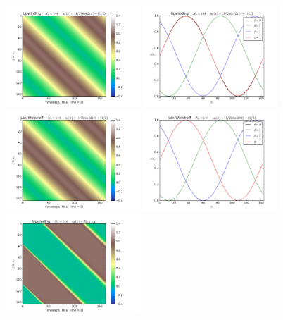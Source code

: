 \documentclass{article} %
\theoremstyle{plain}
\numberwithin{equation}{section} %
\numberwithin{figure}{section} %
\numberwithin{table}{section} %
\begin{document}
\begin{figure}[ht!]
    \centering
    \includegraphics[width=0.45\textwidth]{figures/upwind_smooth.png}
    \includegraphics[width=0.45\textwidth]{figures/upwind_smooth_snapshots.png}
    \includegraphics[width=0.45\textwidth]{figures/LW_smooth.png}
    \includegraphics[width=0.45\textwidth]{figures/LW_smooth_snapshots.png}
    \includegraphics[width=0.45\textwidth]{figures/upwind_discon.png}

\end{figure}
\end{document}
